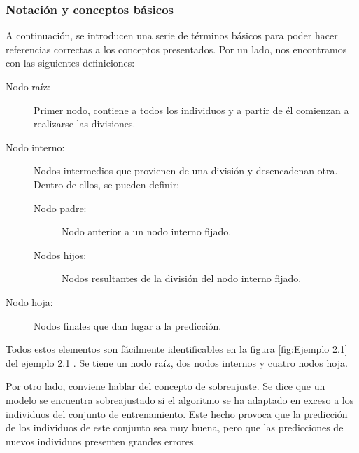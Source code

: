 \documentclass[12pt,twoside]{article}
\begin{document}
\subsubsection{Notación y conceptos básicos}

A continuación, se introducen una serie de términos básicos para poder hacer referencias correctas a los conceptos presentados. Por un lado, nos encontramos con las siguientes definiciones:
\begin{description}
\item[Nodo raíz: ]Primer nodo, contiene a todos los individuos y a partir de él comienzan a realizarse las divisiones.
\item[Nodo interno: ]Nodos intermedios que provienen de una división y desencadenan otra. Dentro de ellos, se pueden definir:
	\begin{description}
	\item[Nodo padre: ]Nodo anterior a un nodo interno fijado.
	\item[Nodos hijos: ]Nodos resultantes de la división del nodo interno fijado.
	\end{description}
\item[Nodo hoja: ]Nodos finales que dan lugar a la predicción.
\end{description}

Todos estos elementos son fácilmente identificables en la figura \ref{fig:Ejemplo 2.1} del ejemplo 2.1 . Se tiene un nodo raíz, dos nodos internos y cuatro nodos hoja.

Por otro lado, conviene hablar del concepto de sobreajuste. Se dice que un modelo se encuentra sobreajustado si el algoritmo se ha adaptado en exceso a los individuos del conjunto de entrenamiento. Este hecho provoca que la predicción de los individuos de este conjunto sea muy buena, pero que las predicciones de nuevos individuos presenten grandes errores.

\end{document}
